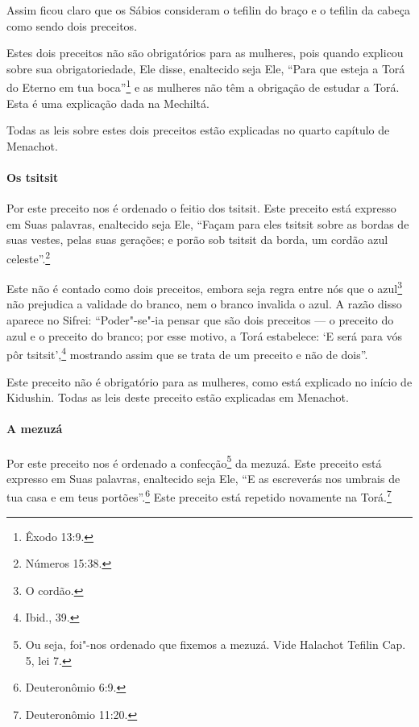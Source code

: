 \begin{multicols}{2}
Assim ficou claro que os Sábios consideram o tefilin\starr{} do braço e o
tefilin\starr{} da cabeça como sendo dois preceitos.

Estes dois preceitos não são obrigatórios para as mulheres, pois quando
explicou sobre sua obrigatoriedade, Ele disse, enaltecido seja Ele,
``Para que esteja a Torá\starr{} do Eterno em tua boca''\footnote{Êxodo 13:9.} e as
mulheres não têm a obrigação de estudar a Torá\starr. Esta é uma explicação
dada na Mechiltá\starr.

Todas as leis sobre estes dois preceitos estão explicadas no quarto
capítulo de Menachot\starr.

\paragraph{Os tsitsit\starr}

Por este preceito nos é ordenado o feitio dos tsitsit\starr. Este
preceito está expresso em Suas palavras, enaltecido seja Ele, ``Façam
para eles tsitsit\starr{} sobre as bordas de suas vestes, pelas suas gerações;
e porão sob tsitsit\starr{} da borda, um cordão azul celeste''.\footnote{Números
15:38.}

Este não é contado como dois preceitos, embora seja regra entre nós que
o azul\footnote{O cordão.} não prejudica a validade do
branco, nem o branco invalida
o azul. A razão disso aparece no Sifrei\starr:
``Poder"-se"-ia pensar que são dois preceitos --- o preceito do azul e o
preceito do branco; por esse motivo, a Torá\starr{} estabelece: `E será para
vós pôr tsitsit\starr',\footnote{Ibid., 39.} mostrando assim que se trata de um
preceito e não de dois''.

Este preceito não é obrigatório para as mulheres, como está explicado no
início de Kidushin\starr. Todas as leis deste preceito estão explicadas em
Menachot\starr.

\paragraph{A mezuzá\starr}

Por este preceito nos é ordenado a confecção\footnote{Ou seja, foi"-nos ordenado que fixemos a mezuzá\starr. Vide Halachot Tefilin\starr{} Cap. 5, lei 7.} da
mezuzá\starr. Este
preceito está expresso em Suas palavras, enaltecido seja Ele, ``E as
escreverás
nos umbrais de tua casa e em teus portões''.\footnote{Deuteronômio 6:9.} Este
preceito está repetido novamente na Torá\starr.\footnote{Deuteronômio 11:20.}


\end{multicols}
